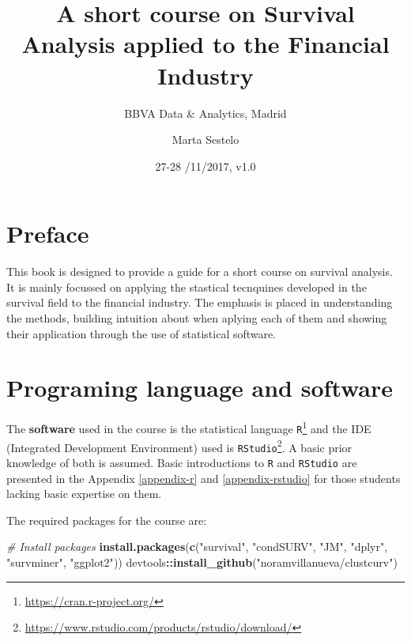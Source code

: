 \documentclass[]{book}
\title{A short course on Survival Analysis applied to the Financial Industry}
\subtitle{BBVA Data \& Analytics, Madrid}
\author{Marta Sestelo}
\date{27-28 /11/2017, v1.0}
\makeatletter
\newenvironment{Shaded}{\begin{snugshade}}{\end{snugshade}}
\newcommand{\KeywordTok}[1]{\textcolor[rgb]{0.13,0.29,0.53}{\textbf{#1}}}
\newcommand{\StringTok}[1]{\textcolor[rgb]{0.31,0.60,0.02}{#1}}
\newcommand{\CommentTok}[1]{\textcolor[rgb]{0.56,0.35,0.01}{\textit{#1}}}
\newcommand{\OperatorTok}[1]{\textcolor[rgb]{0.81,0.36,0.00}{\textbf{#1}}}
\newcommand{\NormalTok}[1]{#1}
\let\rmarkdownfootnote\footnote%
\def\footnote{\protect\rmarkdownfootnote}
\renewcommand{\href}[2]{#2\footnote{\url{#1}}}
\newenvironment{kframe}{%
\medskip{}
\setlength{\fboxsep}{.8em}
 \def\at@end@of@kframe{}%
 \ifinner\ifhmode%
  \def\at@end@of@kframe{\end{minipage}}%
  \begin{minipage}{\columnwidth}%
 \fi\fi%
 \def\FrameCommand##1{\hskip\@totalleftmargin \hskip-\fboxsep
 \colorbox{shadecolor}{##1}\hskip-\fboxsep
     \hskip-\linewidth \hskip-\@totalleftmargin \hskip\columnwidth}%
 \MakeFramed {\advance\hsize-\width
   \@totalleftmargin\z@ \linewidth\hsize
   \@setminipage}}%
 {\par\unskip\endMakeFramed%
 \at@end@of@kframe}
\renewenvironment{Shaded}{\begin{kframe}}{\end{kframe}}
\theoremstyle{definition}
\theoremstyle{definition}
\theoremstyle{definition}
\theoremstyle{remark}
\makeatother
\begin{document}
\maketitle

{
\setcounter{tocdepth}{1}
\tableofcontents
}
\chapter*{Preface}\label{preface}

This book is designed to provide a guide for a short course on survival
analysis. It is mainly focussed on applying the stastical tecnquines
developed in the survival field to the financial industry. The emphasis
is placed in understanding the methods, building intuition about when
aplying each of them and showing their application through the use of
statistical software.

\chapter*{Programing language and
software}\label{programing-language-and-software}

The \textbf{software} used in the course is the statistical language
\href{https://cran.r-project.org/}{\texttt{R}} and the IDE (Integrated
Development Environment) used is
\href{https://www.rstudio.com/products/rstudio/download/}{\texttt{RStudio}}.
A basic prior knowledge of both is assumed. Basic introductions to
\texttt{R} and \texttt{RStudio} are presented in the Appendix
\ref{appendix-r} and \ref{appendix-rstudio} for those students lacking
basic expertise on them.

The required packages for the course are:

\begin{Shaded}
\begin{Highlighting}[]
\CommentTok{# Install packages}
\KeywordTok{install.packages}\NormalTok{(}\KeywordTok{c}\NormalTok{(}\StringTok{"survival"}\NormalTok{, }\StringTok{"condSURV"}\NormalTok{, }\StringTok{"JM"}\NormalTok{, }\StringTok{"dplyr"}\NormalTok{, }\StringTok{"survminer"}\NormalTok{, }\StringTok{"ggplot2"}\NormalTok{))}
\NormalTok{devtools}\OperatorTok{::}\KeywordTok{install_github}\NormalTok{(}\StringTok{"noramvillanueva/clustcurv"}\NormalTok{)}
\end{Highlighting}
\end{Shaded}
\end{document}
